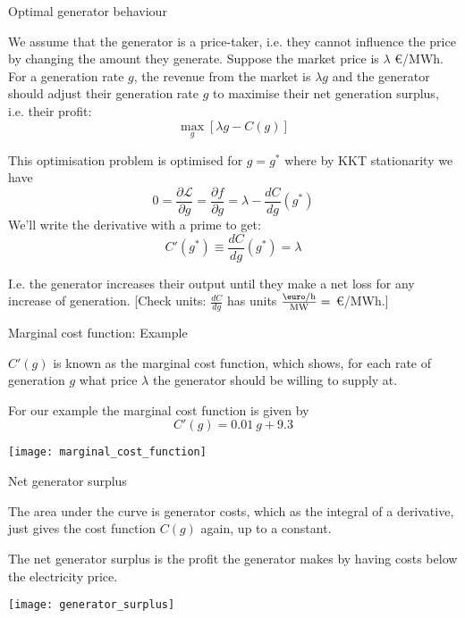 \documentclass[10pt,aspectratio=169,dvipsnames]{beamer}
\def\l{\lambda}
\def\d{\partial}
\def\cL{\mathcal{L}}
\begin{document}
\begin{frame}{Optimal generator behaviour}

  We assume that the generator is a \alert{price-taker},
  i.e. they cannot influence the price by changing the amount they
  generate.  Suppose the market price is $\lambda$ \euro/MWh. For a generation
  rate $g$, the \alert{revenue} from the market is $\l g$ and the generator should adjust their
generation rate $g$ to maximise their \alert{net generation surplus}, i.e. their \alert{profit}:
  \begin{equation*}
    \max_g \left[ \l g - C(g) \right]
  \end{equation*}

  This optimisation problem is optimised for $g=g^*$ where by KKT stationarity we have
  \begin{equation*}
    0 = \frac{\d \cL}{\d g} = \frac{\d f}{\d g} = \l  -  \frac{dC}{dg} (g^*)
  \end{equation*}
  We'll write the derivative with a prime to get:
  \begin{equation*}
    C'(g^*) \equiv \frac{dC}{dg} (g^*) =  \l
  \end{equation*}

  I.e. the generator increases their output until they make a net loss for any increase of generation.
  [Check units: $\frac{dC}{dg}$ has units $\frac{\textrm{\euro/h}}{\textrm{MW}} = $ \euro/MWh.]

\end{frame}



\begin{frame}{Marginal cost function: Example}

  $C'(g)$ is known as the \alert{marginal cost function}, which shows,
  for each rate of generation $g$ what price $\l$ the generator should be
  willing to supply at.

  For our example the marginal cost function is given by
  \begin{equation*}
    C'(g) = 0.01~g + 9.3
  \end{equation*}

  \centering
  \texttt{[image: marginal\_cost\_function]}

\end{frame}





\begin{frame}{Net generator surplus}

  The area under the curve is generator costs, which as the integral
  of a derivative, just gives the cost function $C(g)$ again, up to a
  constant.


  The \alert{net generator surplus} is the profit the generator makes by
  having costs below the electricity price.

  \centering
  \texttt{[image: generator\_surplus]}

\end{frame}
\end{document}
